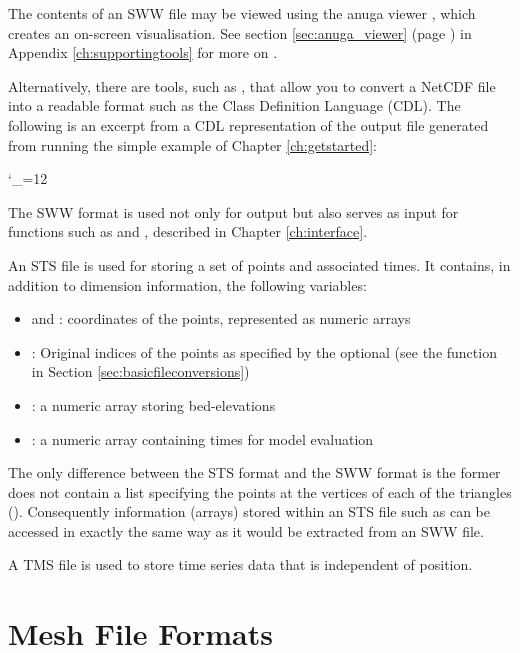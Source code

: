 \documentclass{manual}
\newcommand{\verbatiminputB}[1]{%
\endgroup}
\def\verbatiminputunderscore{\begingroup 
\catcode`\_=12
\verbatiminputB}
\begin{document}
The contents of an SWW file may be viewed using the anuga viewer ,
which creates an on-screen visualisation.  See section \ref{sec:anuga_viewer}
(page \pageref{sec:anuga_viewer}) in Appendix \ref{ch:supportingtools} for more on .

Alternatively, there are tools, such as , that allow
you to convert a NetCDF file into a readable format such as the
Class Definition Language (CDL). The following is an excerpt from a
CDL representation of the output file  generated
from running the simple example  of Chapter \ref{ch:getstarted}:

\verbatiminputunderscore{../../anuga_core/examples/bedslopeexcerpt.cdl}

The SWW format is used not only for output but also serves as input
for functions such as  and
, described in Chapter \ref{ch:interface}.

An STS file is used for storing a set of points and associated times.
It contains, in addition to dimension information, the following
variables:
\begin{itemize}
  \item {} and : coordinates of the points, represented as numeric arrays
  \item {}: Original indices of the points as specified by the optional  
                            (see the function  in Section \ref{sec:basicfileconversions})
  \item {}: a numeric array storing bed-elevations
  \item {}: a numeric array containing times for model evaluation
\end{itemize}

The only difference between the STS format and the SWW format is the former does
not contain a list specifying the points at the vertices of each of the triangles
(). Consequently information (arrays) stored within an STS file such
as  can be accessed in exactly the same way as it would be extracted
from an SWW file.

A TMS file is used to store time series data that is independent of position.

\section{Mesh File Formats}
\end{document}
